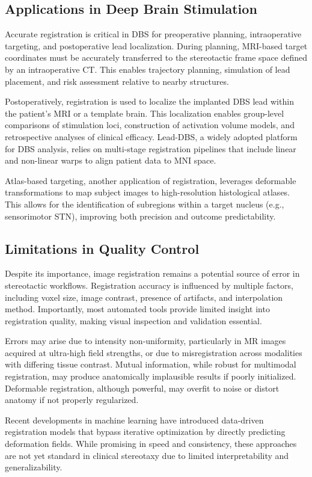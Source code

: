 \subsection{Applications in Deep Brain Stimulation}
Accurate registration is critical in DBS for preoperative planning, intraoperative targeting, and postoperative lead localization. During planning, MRI-based target coordinates must be accurately transferred to the stereotactic frame space defined by an intraoperative CT. This enables trajectory planning, simulation of lead placement, and risk assessment relative to nearby structures.

Postoperatively, registration is used to localize the implanted DBS lead within the patient's MRI or a template brain. This localization enables group-level comparisons of stimulation loci, construction of activation volume models, and retrospective analyses of clinical efficacy. Lead-DBS, a widely adopted platform for DBS analysis, relies on multi-stage registration pipelines that include linear and non-linear warps to align patient data to MNI space.

Atlas-based targeting, another application of registration, leverages deformable transformations to map subject images to high-resolution histological atlases. This allows for the identification of subregions within a target nucleus (e.g., sensorimotor STN), improving both precision and outcome predictability.

\subsection{Limitations in Quality Control}
Despite its importance, image registration remains a potential source of error in stereotactic workflows. Registration accuracy is influenced by multiple factors, including voxel size, image contrast, presence of artifacts, and interpolation method. Importantly, most automated tools provide limited insight into registration quality, making visual inspection and validation essential.

Errors may arise due to intensity non-uniformity, particularly in MR images acquired at ultra-high field strengths, or due to misregistration across modalities with differing tissue contrast. Mutual information, while robust for multimodal registration, may produce anatomically implausible results if poorly initialized. Deformable registration, although powerful, may overfit to noise or distort anatomy if not properly regularized.

Recent developments in machine learning have introduced data-driven registration models that bypass iterative optimization by directly predicting deformation fields. While promising in speed and consistency, these approaches are not yet standard in clinical stereotaxy due to limited interpretability and generalizability.

